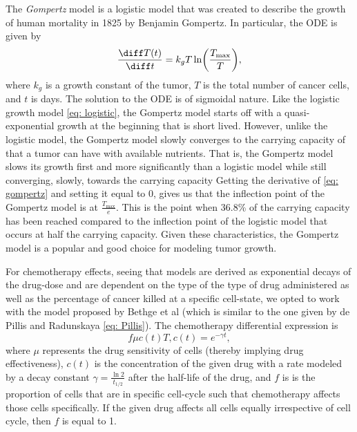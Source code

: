 \documentclass[11pt]{amsart}
\begin{document}
The \textit{Gompertz} model is a logistic model that was created to describe the growth of human mortality in 1825 by Benjamin Gompertz.
In particular, the ODE is given by
\begin{equation}
	\frac{\diff T(t)}{\diff t} = k_g T \ln \biggl(\frac{T_{\max}}{T} \biggr) \label{eq: gompertz},
\end{equation}
where $k_g$ is a growth constant of the tumor, $T$ is the total number of cancer cells, and $t$ is days.
The solution to the ODE is of sigmoidal nature.
Like the logistic growth model \eqref{eq: logistic}, the Gompertz model starts off with a quasi-exponential growth at the beginning that is short lived.
However, unlike the logistic model, the Gompertz model slowly converges to the carrying capacity of that a tumor can have with available nutrients.
That is, the Gompertz model slows its growth first and more significantly than a logistic model while still converging, slowly, towards the carrying capacity %
Getting the derivative of \eqref{eq: gompertz} and setting it equal to 0, gives us that  the inflection point of the Gompertz model is at $\frac{T_{\max}}{e}$.
This is the point when 36.8\% of the carrying capacity has been reached compared to the inflection point of the logistic model that occurs at half the carrying capacity.
Given these characteristics, the Gompertz model is a popular and good choice for modeling tumor growth.

For chemotherapy effects, seeing that models are derived as exponential decays of the drug-dose and are dependent on the type of the type of drug administered as well as the percentage of cancer killed at a specific cell-state, we opted to work with the model proposed by Bethge et al (which is similar to the one given by de Pillis and Radunskaya \eqref{eq: Pillis}). The chemotherapy differential expression is 
\begin{equation}
	f \mu c(t) T, c(t) = e^{-\gamma t} \label{eq: chemo},
\end{equation}
where $\mu$ represents the drug sensitivity of cells (thereby implying drug effectiveness), $c(t)$ is the concentration of the given drug with a rate modeled by a decay constant $\gamma=\frac{\ln{2}}{t_{1/2}}$ after the half-life of the drug, and $f$ is is the proportion of cells that are in specific cell-cycle such that chemotherapy affects those cells specifically.
If the given drug affects all cells equally irrespective of cell cycle, then $f$ is equal to 1.
\end{document}
